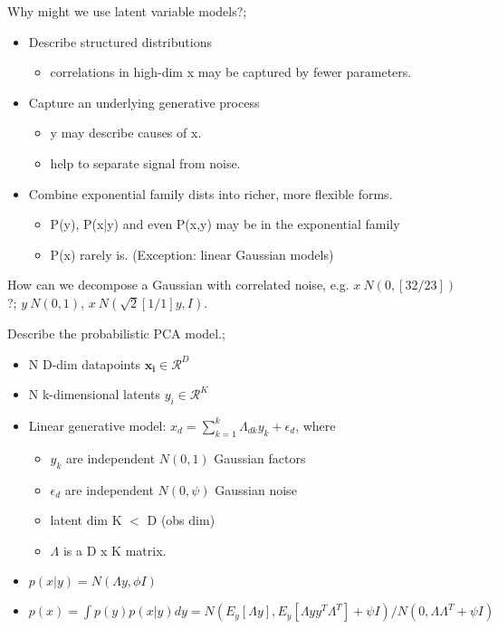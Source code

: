 \documentclass{article}
\begin{document}
Why might we use latent variable models?; \begin{itemize}
	\item Describe structured distributions \begin{itemize}
		\item correlations in high-dim x may be captured by fewer parameters.
	\end{itemize}
\item Capture an underlying generative process
\begin{itemize}
	\item y may describe causes of x.
	\item help to separate signal from noise.
\end{itemize}
\item Combine exponential family dists into richer, more flexible forms.
\begin{itemize}
	\item P(y), P(x|y) and even P(x,y) may be in the exponential family
	\item P(x) rarely is. (Exception: linear Gaussian models)
\end{itemize}
\end{itemize}

How can we decompose a Gaussian with correlated noise, e.g. $x~N(0, [ 3 2 / 2 3])$?; $y~N(0,1)$, $x~N(\sqrt{2}[1 / 1]y, I)$.

Describe the probabilistic PCA model.; \begin{itemize}
	\item N D-dim datapoints $\mathbf{x_i} \in \mathcal{R}^D$
	\item N k-dimensional latents $y_i \in \mathcal{R}^K$
	\item Linear generative model: $x_d = \sum_{k=1}^k \Lambda_{dk}y_k + \epsilon_d$, where
	\begin{itemize}
		\item $y_k$ are independent $N(0,1)$ Gaussian factors
		\item $\epsilon_d$ are independent $N(0,\psi)$ Gaussian noise
		\item latent dim K $<$ D (obs dim)
		\item $\Lambda$ is a D x K matrix.
	\end{itemize}
\item $p(x|y) = N(\Lambda y,\phi I)$
\item $p(x) = \int p(y)p(x|y)dy = N(E_y[\Lambda y], E_y[\Lambda y y^T\Lambda^T]+\psi I)/N(0,\Lambda\Lambda^T+\psi I)$
\end{itemize}
\end{document}
